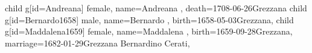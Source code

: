 \documentclass{article}
\begin{document}
\begin{midpage}
\begin{center}
\begin{genealogypicture}
{{{{{                }
                child{
                    g[id=Andreana]{
                        female,
                        name={Andreana },
                        death={1708-06-26}{Grezzana}
                    }
                }
            }
            child{
                g[id=Bernardo1658]{
                    male,
                    name={Bernardo },
                    birth={1658-05-03}{Grezzana},
                }
            }
            child{
                g[id=Maddalena1659]{
                    female,
                    name={Maddalena },
                    birth={1659-09-28}{Grezzana},
                    marriage={1682-01-29}{Grezzana \newline Bernardino Cerati},
                }
            }
        }
    }
}
\end{genealogypicture}

\end{center}
\end{midpage}
\end{document}
